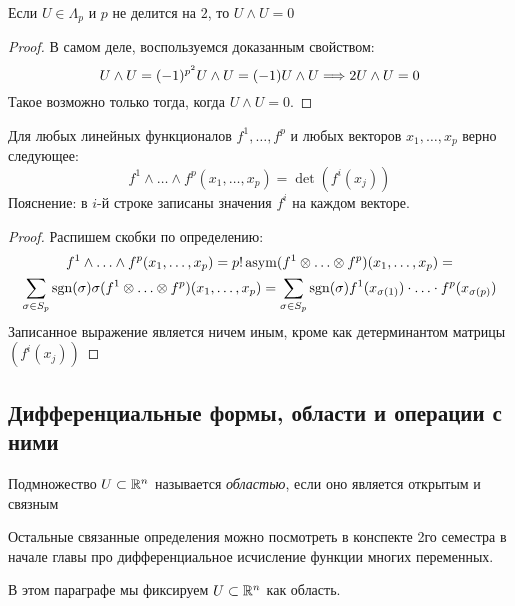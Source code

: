 \begin{corollary}
	Если $U \in \Lambda_p$ и $p$ не делится на $2$, то $U \wedge U = 0$
\end{corollary}

\begin{proof}
	В самом деле, воспользуемся доказанным свойством:
	\[
		U \wedge U = (-1)^{p^2} U \wedge U = (-1) U \wedge U \Longrightarrow 2U \wedge U = 0
	\]
	Такое возможно только тогда, когда $U \wedge U = 0$.
\end{proof}

\begin{lemma}
	Для любых линейных функционалов $f^1, \ldots, f^p$ и любых векторов $x_1, \ldots, x_p$ верно следующее:
	\[
	f^1 \wedge \ldots \wedge f^p(x_1, \ldots, x_p) = \det(f^i(x_j))
	\]
	Пояснение: в $i$-й строке записаны значения $f^i$ на каждом векторе.
\end{lemma}

\begin{proof}
	Распишем скобки по определению:
	\begin{multline*}
	f^1 \wedge \ldots \wedge f^p(x_1, \ldots, x_p) = p!\operatorname{asym}(f^1 \otimes \ldots \otimes f^p)(x_1, \ldots, x_p) =
	\\
	\sum_{\sigma \in S_p} \operatorname{sgn}(\sigma) \sigma (f^1 \otimes \ldots \otimes f^p)(x_1, \ldots, x_p) = \sum_{\sigma \in S_p} \operatorname{sgn}(\sigma) f^1(x_{\sigma(1)}) \cdot \ldots \cdot f^p(x_{\sigma(p)})
	\end{multline*}
	Записанное выражение является ничем иным, кроме как детерминантом матрицы $(f^i(x_j))$
\end{proof}

\subsection{Дифференциальные формы, области и операции с ними}

\begin{reminder}
	Подмножество $U \subset \mathbb{R}^n$ называется \textit{областью}, если оно является открытым и связным
\end{reminder}

\begin{anote}
	Остальные связанные определения можно посмотреть в конспекте 2го семестра в начале главы про дифференциальное исчисление функции многих переменных.
\end{anote}

\begin{note}
	В этом параграфе мы фиксируем $U \subset \mathbb{R}^n$ как область.
\end{note}

